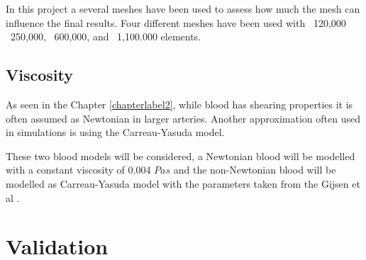 In this project a several meshes have been used to  assess how much the mesh can influence the final results. Four different meshes have been used with ~120,000 ~250,000, ~600,000, and ~1,100.000 elements.\par

\subsection{Viscosity}
As seen in the Chapter \ref{chapterlabel2}, while blood has shearing properties it is often assumed as Newtonian in larger arteries. Another approximation often used in simulations is using the Carreau-Yasuda model. \par

These two blood models will be considered, a Newtonian blood will be modelled with a constant viscosity of 0.004 $Pa s$ and the non-Newtonian blood will be modelled as Carreau-Yasuda model with the parameters taken from the Gijsen et al \cite{Gijsen1999TheModel}.


\section{Validation}